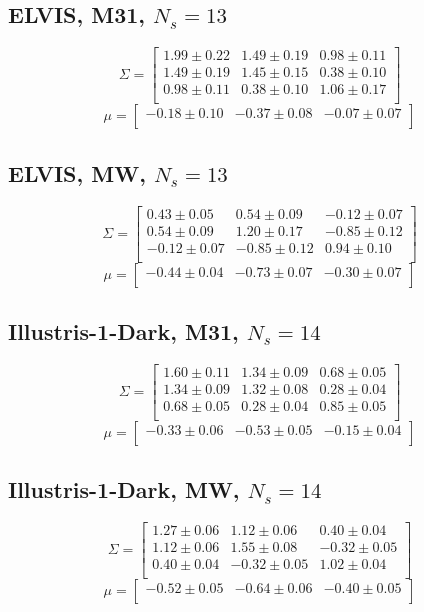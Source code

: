 \documentclass[a4paper,fleqn,usenatbib]{mnras}
\begin{document}
\subsection{ELVIS, M31, $N_s=13$}
\[
\Sigma=
\begin{bmatrix}
1.99 \pm 0.22 & 1.49 \pm 0.19 & 0.98 \pm 0.11\\
1.49 \pm 0.19 & 1.45 \pm 0.15 & 0.38 \pm 0.10\\
0.98 \pm 0.11 & 0.38 \pm 0.10 & 1.06 \pm 0.17\\
\end{bmatrix}
\]
\[
\mu=
\begin{bmatrix}
-0.18 \pm 0.10 & -0.37 \pm 0.08 & -0.07 \pm 0.07\\
\end{bmatrix}
\]
\subsection{ELVIS, MW, $N_s=13$}
\[
\Sigma=
\begin{bmatrix}
0.43 \pm 0.05 & 0.54 \pm 0.09 & -0.12 \pm 0.07\\
0.54 \pm 0.09 & 1.20 \pm 0.17 & -0.85 \pm 0.12\\
-0.12 \pm 0.07 & -0.85 \pm 0.12 & 0.94 \pm 0.10\\
\end{bmatrix}
\]
\[
\mu=
\begin{bmatrix}
-0.44 \pm 0.04 & -0.73 \pm 0.07 & -0.30 \pm 0.07\\
\end{bmatrix}
\]

\subsection{Illustris-1-Dark, M31, $N_s=14$}
\[
\Sigma=
\begin{bmatrix}
1.60 \pm 0.11 & 1.34 \pm 0.09 & 0.68 \pm 0.05\\
1.34 \pm 0.09 & 1.32 \pm 0.08 & 0.28 \pm 0.04\\
0.68 \pm 0.05 & 0.28 \pm 0.04 & 0.85 \pm 0.05\\
\end{bmatrix}
\]
\[
\mu=
\begin{bmatrix}
-0.33 \pm 0.06 & -0.53 \pm 0.05 & -0.15 \pm 0.04\\
\end{bmatrix}
\]
\subsection{Illustris-1-Dark, MW, $N_s=14$}
\[
\Sigma=
\begin{bmatrix}
1.27 \pm 0.06 & 1.12 \pm 0.06 & 0.40 \pm 0.04\\
1.12 \pm 0.06 & 1.55 \pm 0.08 & -0.32 \pm 0.05\\
0.40 \pm 0.04 & -0.32 \pm 0.05 & 1.02 \pm 0.04\\
\end{bmatrix}
\]
\[
\mu=
\begin{bmatrix}
-0.52 \pm 0.05 & -0.64 \pm 0.06 & -0.40 \pm 0.05\\
\end{bmatrix}
\]
\end{document}
